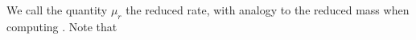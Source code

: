 We call the quantity \(\mu_r\) the reduced rate, with analogy to the reduced mass when computing .  Note that